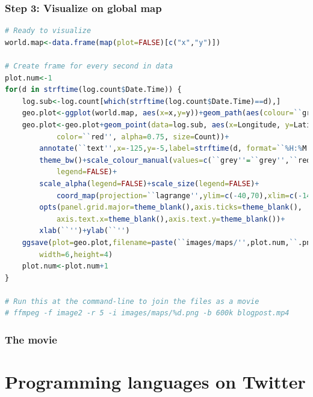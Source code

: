 \documentclass[xcolor=dvipsnames, 9pt]{beamer}
\begin{document}
\begin{frame}[fragile]
    \frametitle{Step 3: Visualize on global map}
    \scriptsize{\begin{lstlisting}[language=R]
# Ready to visualize
world.map<-data.frame(map(plot=FALSE)[c("x","y")])

# Create frame for every second in data
plot.num<-1
for(d in strftime(log.count$Date.Time)) {
    log.sub<-log.count[which(strftime(log.count$Date.Time)==d),]
    geo.plot<-ggplot(world.map, aes(x=x,y=y))+geom_path(aes(colour=``grey''))
    geo.plot<-geo.plot+geom_point(data=log.sub, aes(x=Longitude, y=Latitude, 
            color=``red'', alpha=0.75, size=Count))+
        annotate(``text'',x=-125,y=-5,label=strftime(d, format=``%H:%M:%S''))+
        theme_bw()+scale_colour_manual(values=c(``grey''=``grey'',``red''=``red''),
            legend=FALSE)+
        scale_alpha(legend=FALSE)+scale_size(legend=FALSE)+
            coord_map(projection=``lagrange'',ylim=c(-40,70),xlim=c(-145,155))+
        opts(panel.grid.major=theme_blank(),axis.ticks=theme_blank(),
            axis.text.x=theme_blank(),axis.text.y=theme_blank())+
        xlab(``'')+ylab(``'')
    ggsave(plot=geo.plot,filename=paste(``images/maps/'',plot.num,``.png'',sep=``''),
        width=6,height=4)
    plot.num<-plot.num+1
}

# Run this at the command-line to join the files as a movie
# ffmpeg -f image2 -r 5 -i images/maps/%d.png -b 600k blogpost.mp4
    \end{lstlisting}}
\end{frame}

\begin{frame}[fragile]
    \frametitle{The movie}
    \begin{center}
    \end{center}
\end{frame}


\section{Programming languages on Twitter} %
\label{sec:comparison_of_programming_language_tweeting}
\end{document}
